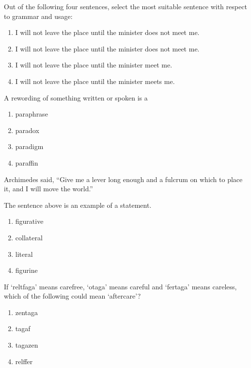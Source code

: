 \iffalse
\chapter{2016}
\author{EE24BTECH11004}
\section{ce}
\fi

\item Out of the following four sentences, select the most suitable sentence with respect to grammar and usage:
\begin{enumerate}
    \item I will not leave the place until the minister does not meet me.
    \item I will not leave the place until the minister does not meet me.
    \item I will not leave the place until the minister meet me.
    \item I will not leave the place until the minister meets me.
\end{enumerate}

\item A rewording of something written or spoken is a 
\begin{enumerate}
    \item paraphrase
    \item paradox
    \item paradigm
    \item paraffin
\end{enumerate}

\item Archimedes said, ``Give me a lever long enough and a fulcrum on which to place it, and I will move the world.''

The sentence above is an example of a statement.
\begin{enumerate}
    \item figurative
    \item collateral
    \item literal
    \item figurine
\end{enumerate}

\item If `reltfaga' means carefree, `otaga' means careful and `fertaga' means careless, which of the following could mean `aftercare'?

\begin{enumerate}
    \item zentaga
    \item tagaf
    \item tagazen
    \item relffer
\end{enumerate}

